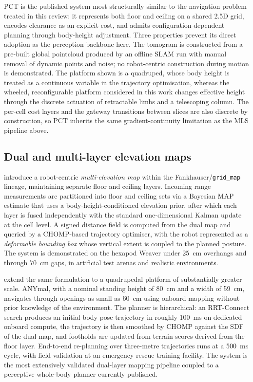 \documentclass[11pt,a4paper]{article}
\begin{document}
PCT is the published system most structurally similar to the navigation problem treated in this review: it represents both floor and ceiling on a shared 2.5D grid, encodes clearance as an explicit cost, and admits configuration-dependent planning through body-height adjustment. Three properties prevent its direct adoption as the perception backbone here. The tomogram is constructed from a pre-built global pointcloud produced by an offline SLAM run with manual removal of dynamic points and noise; no robot-centric construction during motion is demonstrated. The platform shown is a quadruped, whose body height is treated as a continuous variable in the trajectory optimisation, whereas the wheeled, reconfigurable platform considered in this work changes effective height through the discrete actuation of retractable limbs and a telescoping column. The per-cell cost layers and the gateway transitions between slices are also discrete by construction, so PCT inherits the same gradient-continuity limitation as the MLS pipeline above.

\subsection{Dual and multi-layer elevation maps}
\label{sec:sq1:dual}

\citet{buchananWalkingPostureAdaptation2019} introduce a robot-centric \emph{multi-elevation map} within the Fankhauser/\texttt{grid\_map} lineage, maintaining separate floor and ceiling layers. Incoming range measurements are partitioned into floor and ceiling sets via a Bayesian MAP estimate that uses a body-height-conditioned elevation prior, after which each layer is fused independently with the standard one-dimensional Kalman update at the cell level. A signed distance field is computed from the dual map and queried by a CHOMP-based trajectory optimiser, with the robot represented as a \emph{deformable bounding box} whose vertical extent is coupled to the planned posture. The system is demonstrated on the hexapod Weaver under \SI{25}{\centi\metre} overhangs and through \SI{70}{\centi\metre} gaps, in artificial test arenas and realistic environments.

\citet{PerceptiveWholebodyPlanning} extend the same formulation to a quadrupedal platform of substantially greater scale. ANYmal, with a nominal standing height of \SI{80}{\centi\metre} and a width of \SI{59}{\centi\metre}, navigates through openings as small as \SI{60}{\centi\metre} using onboard mapping without prior knowledge of the environment. The planner is hierarchical: an RRT-Connect search produces an initial body-pose trajectory in roughly \SI{100}{\milli\second} on dedicated onboard compute, the trajectory is then smoothed by CHOMP against the SDF of the dual map, and footholds are updated from terrain scores derived from the floor layer. End-to-end re-planning over three-metre trajectories runs at a \SI{500}{\milli\second} cycle, with field validation at an emergency rescue training facility. The system is the most extensively validated dual-layer mapping pipeline coupled to a perceptive whole-body planner currently published.
\end{document}
